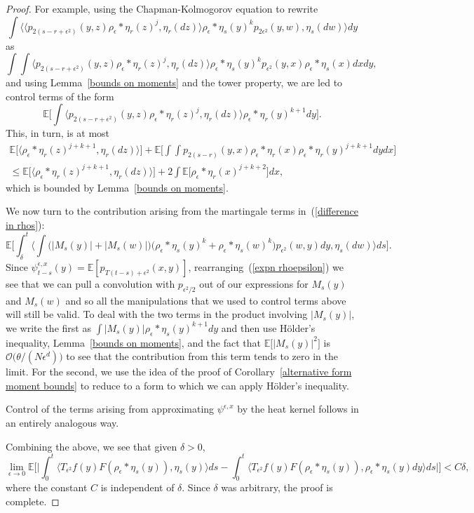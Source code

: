 \documentclass[EJP]{ejpecp} %
\newcommand{\IE}{\mathbb E}
\begin{document}
\begin{proof}
For example, using the Chapman-Kolmogorov equation to rewrite
\[
\int\Big\langle 
\big\langle p_{2(s-r+\epsilon^2)}(y,z)\rho_\epsilon*\eta_r(z)^j, \eta_r(dz)
\big\rangle
\rho_\epsilon*\eta_s(y)^k p_{2\epsilon^2}(y,w), \eta_s(dw)\Big\rangle dy
\]
as 
\[
\int\int
\big\langle p_{2(s-r+\epsilon^2)}(y,z)\rho_\epsilon*\eta_r(z)^j, \eta_r(dz)
\big\rangle
\rho_\epsilon*\eta_s(y)^k p_{\epsilon^2}(y,x)\rho_\epsilon*\eta_s(x) dx dy,
\]
and using Lemma~\ref{bounds on moments} and the tower property, we are led to 
control terms of the form
\[
\IE\Big[\int\big\langle p_{2(s-r+\epsilon^2)}(y,z)\rho_\epsilon*\eta_r(z)^j, 
\eta_r(dz)\big\rangle \rho_\epsilon*\eta_r(y)^{k+1} dy\Big].
\]
This, in turn, is at most
\begin{multline*}
\IE\Big[\big\langle \rho_\epsilon*\eta_r(z)^{j+k+1}, \eta_r(dz)\rangle\Big]
+\IE\Big[\int\int p_{2(s-r)}(y,x)\rho_\epsilon*\eta_r(x)
	\rho_\epsilon*\eta_r(y)^{j+k+1} dy dx\Big]
\\
\leq
\IE\Big[\big\langle \rho_\epsilon*\eta_r(z)^{j+k+1}, \eta_r(dz)\rangle\Big]
+2\int\IE\Big[\rho_\epsilon*\eta_r(x)^{j+k+2}\Big]dx,
\end{multline*} 
which is bounded by Lemma~\ref{bounds on moments}.

We now turn to the contribution arising from the martingale terms 
in~(\ref{difference in rhos}):
\[
\IE\Big[
\int_\delta^t\Big\langle\int 
\big(|M_s(y)|+|M_s(w)|\big)\big(\rho_\epsilon*\eta_s(y)^k+
\rho_\epsilon*\eta_s(w)^k\big)p_{\epsilon^2}(w,y)dy, \eta_s(dw)\Big\rangle ds
\Big] .
\]
Since $\psi_{t-s}^{\epsilon,x}(y)=\IE[p_{T(t-s)+\epsilon^2}(x,y)]$, 
rearranging~(\ref{expn rhoepsilon})
we see that we can pull a convolution with $p_{\epsilon^2/2}$ out of
our expressions for $M_s(y)$ and $M_s(w)$ and so all the manipulations 
that we used to control terms above will still be valid.
To deal with the two terms in the product involving $|M_s(y)|$, we write 
the first as $\int |M_s(y)|\rho_\epsilon*\eta_s(y)^{k+1}dy$ and then use
H\"older's inequality, Lemma~\ref{bounds on moments}, and the fact
that $\IE\big[|M_s(y)|^2\big]$ is ${\mathcal O}\big(\theta/(N\epsilon^d)\big)$
to see that the contribution from this term tends to zero in the limit.
For the second, we use the idea of the proof of 
Corollary~\ref{alternative form moment bounds} to reduce to a form to which
we can apply H\"older's inequality.

Control of the terms arising from approximating $\psi^{\epsilon,x}$
by the heat kernel follows in an entirely analogous way.

Combining the above, we see that given $\delta>0$, 
\[
\lim_{\epsilon\to 0}\IE\Big[\Big|\int_0^t\big\langle T_{\epsilon^2} f(y) 
F(\rho_\epsilon *\eta_s(y)), \eta_s(y) \big\rangle ds 
- \int_0^t\big\langle T_{\epsilon^2} f(y) 
F(\rho_\epsilon * \eta_s(y)), \rho_\epsilon * \eta_s(y) dy 
\big\rangle ds\Big|\Big]
<C\delta,
\]
where the constant $C$ is independent of $\delta$.
Since $\delta$ was arbitrary, the proof is complete.
\end{proof}
\end{document}
